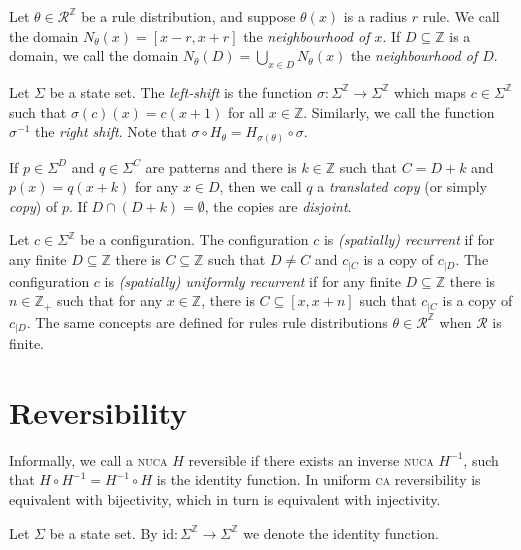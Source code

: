 \documentclass[runningheads]{llncs}
\newcommand{\Z}{\mathbb{Z}}
\newcommand{\R}{\mathcal{R}}
\newcommand{\id}{\mathrm{id}}
\begin{document}
\begin{definition}
Let $\theta \in \R^\Z$ be a rule distribution, and suppose $\theta (x)$ is a radius $r$ rule. We call the domain $N_\theta(x)=[x-r,x+r]$ the \emph{neighbourhood of $x$}. If $D \subseteq \Z$ is a domain, we call the domain $N_\theta (D) = \bigcup_{x\in D} N_\theta (x)$ the \emph{neighbourhood of $D$}.
\end{definition}

\begin{definition}
Let $\Sigma$ be a state set. The \emph{left-shift} is the function $\sigma:\Sigma^\Z \rightarrow \Sigma^\Z$ which maps $c \in \Sigma^\Z$ such that $\sigma (c)(x) = c(x+1)$ for all $x\in \Z$. Similarly, we call the function $\sigma^{-1}$ the \emph{right shift}. Note that $\sigma \circ H_\theta = H_{\sigma(\theta)} \circ \sigma$.

If $p\in \Sigma^D$ and $q\in \Sigma^C$ are patterns and there is $k \in \Z$ such that $C = D+k$ and $p(x) = q(x+k)$ for any $x \in D$, then we call $q$ a \emph{translated copy} (or simply \emph{copy}) of $p$. If $D \cap (D+k) = \emptyset$, the copies are \emph{disjoint}.
\end{definition}

\begin{definition}
Let $c \in \Sigma^\Z$ be a configuration. The configuration $c$ is \emph{(spatially) recurrent} if for any finite $D\subseteq \Z$ there is $C \subseteq \Z$ such that $D \neq C$ and $c_{|C}$ is a copy of $c_{|D}$. The configuration $c$ is \emph{(spatially) uniformly recurrent} if for any finite $D\subseteq \Z$ there is $n \in \Z_+$ such that for any $x \in \Z$, there is $C \subseteq [x,x+n]$ such that  $c_{|C}$ is a copy of $c_{|D}$. The same concepts are defined for rules rule distributions $\theta \in  \R^\Z$ when $\R$ is finite.
\end{definition}

\section{Reversibility}

Informally, we call a \textsc{nuca} $H$ reversible if there exists an inverse \textsc{nuca} $H^{-1}$, such that $H\circ H^{-1} = H^{-1} \circ H$ is the identity function. In uniform \textsc{ca} reversibility is equivalent with bijectivity, which in turn is equivalent with injectivity. 

\begin{definition}
Let $\Sigma$ be a state set. By $\id:\Sigma^\Z \rightarrow \Sigma^\Z$ we denote the identity function.
\end{definition}
\end{document}
